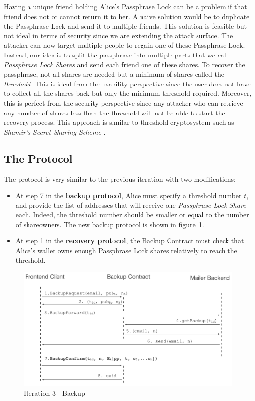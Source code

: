 \documentclass[runningheads]{llncs}
\begin{document}
Having a unique friend holding Alice's Passphrase Lock can be a problem if that friend does not or cannot return it to her. A naive solution would be to duplicate the Passphrase Lock and send it to multiple friends. This solution is feasible but not ideal in terms of security since we are extending the attack surface. The attacker can now target multiple people to regain one of these Passphrase Lock. Instead, our idea is to split the passphrase into multiple parts that we call {\em Passphrase Lock Shares} and send each friend one of these shares. To recover the passphrase, not all shares are needed but a minimum of shares called the {\em threshold}. This is ideal from the usability perspective since the user does not have to collect all the shares back but only the minimum threshold required. Moreover, this is perfect from the security perspective since any attacker who can retrieve any number of shares less than the threshold will not be able to start the recovery process. This approach is similar to threshold cryptosystem such as {\em Shamir's Secret Sharing Scheme} \cite{shamir1979share}. 

\subsection{The Protocol}

The protocol is very similar to the previous iteration with two modifications: 
\begin{itemize}
\item At step 7 in the {\bf backup protocol}, Alice must specify a threshold number $t$, and provide the list of addresses that will receive one {\em Passphrase Lock Share} each. Indeed, the threshold number should be smaller or equal to the number of shareowners. The new backup protocol is shown in figure~\ref{it3:backup}.
\item At step 1 in the {\bf recovery protocol}, the Backup Contract must check that Alice's wallet owns enough Passphrase Lock shares relatively to reach the threshold.
\end{itemize}

\begin{figure}[t]
  \includegraphics[width=\linewidth]{./media/media-006.png}
  \caption{Iteration 3 - Backup}
  \label{it3:backup}
\end{figure}
\end{document}
